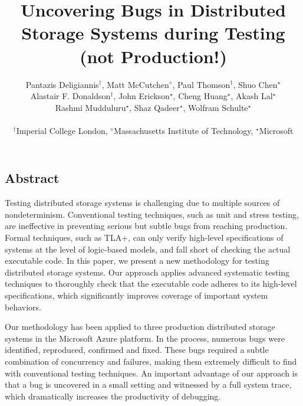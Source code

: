 \documentclass[letterpaper,twocolumn,10pt]{article}
\begin{document}
\date{}

\title{\Large \bf Uncovering Bugs in Distributed Storage Systems during Testing \\ (not Production!)}

\author{
{\rm Pantazis Deligiannis$^\dagger$, Matt McCutchen$^\diamond$, Paul Thomson$^\dagger$, Shuo Chen$^\star$}\\
{\rm Alastair F. Donaldson$^\dagger$, John Erickson$^\star$, Cheng Huang$^\star$, Akash Lal$^\star$}\\
{\rm Rashmi Mudduluru$^\star$, Shaz Qadeer$^\star$, Wolfram Schulte$^\star$}\\\\
$^\dagger$Imperial College London, $^\diamond$Massachusetts Institute of Technology, $^\star$Microsoft\\
} %

\maketitle

\thispagestyle{empty}


\subsection*{Abstract}
Testing distributed storage systems is challenging due to multiple sources of nondeterminism. Conventional testing techniques, such as unit and stress testing, are ineffective in preventing serious but subtle bugs from reaching production. Formal techniques, such as TLA+, can only verify high-level specifications of systems at the level of logic-based models, and fall short of checking the actual executable code. In this paper, we present a new methodology for testing distributed storage systems. Our approach applies advanced systematic testing techniques to thoroughly check that the executable code adheres to its high-level specifications, which significantly improves coverage of important system behaviors.

Our methodology has been applied to three production distributed storage systems in the Microsoft Azure platform. In the process, numerous bugs were identified, reproduced, confirmed and fixed. These bugs required a subtle combination of concurrency and failures, making them extremely difficult to find with conventional testing techniques. An important advantage of our approach is that a bug is uncovered in a small setting and witnessed by a full system trace, which dramatically increases the productivity of debugging.
\end{document}
